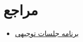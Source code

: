 \documentclass{CSICC}
\begin{document}
%
\section*{مراجع}
\begin{itemize}
	\item
	 \href{https://www.blackhat.com/us-22/briefings/schedule/#controlling-the-source-abusing-source-code-management-systems-26423}{برنامه جلسات توجیهی 
	 	}
\end{itemize}
\end{document}
